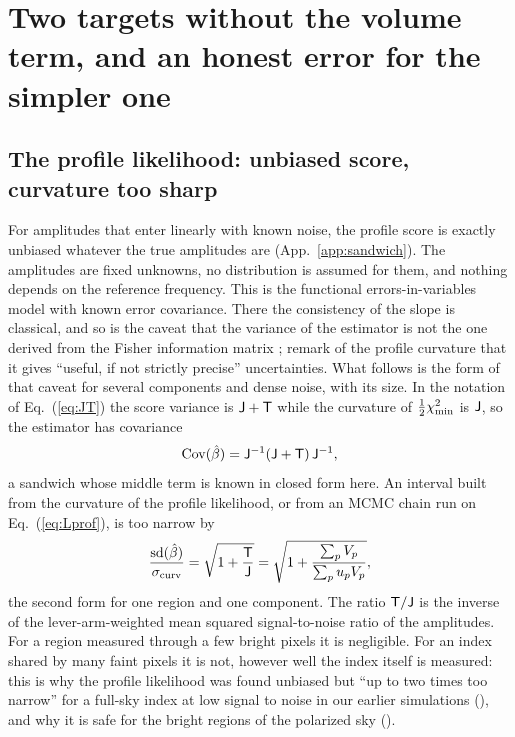 \section{Two targets without the volume term, and an honest error for the simpler one}
\label{sec:profile}

\subsection{The profile likelihood: unbiased score, curvature too sharp}

For amplitudes that enter linearly with known noise, the profile score is exactly unbiased
whatever the true amplitudes are (App.~\ref{app:sandwich}). The amplitudes are fixed unknowns, no
distribution is assumed for them, and nothing depends on the reference frequency. This is the
functional errors-in-variables model with known error covariance. There the consistency of the slope
is classical, and so is the caveat that the variance of the estimator is not the one derived from
the Fisher information matrix \citep[][and references therein; \citealt{fuller1987} is the textbook]{engel1985};
\citet{stompor2009} remark
of the profile curvature that it gives ``useful, if not strictly precise'' uncertainties. What
follows is the form of that caveat for several components and dense noise, with its size. In the notation of Eq.~(\ref{eq:JT}) the score variance is $\mathsf{J} + \mathsf{T}$ while the
curvature of $\tfrac12\chi^2_{\min}$ is $\mathsf{J}$, so the estimator has covariance
\begin{equation}
  \mathrm{Cov}(\hat\beta) = \mathsf{J}^{-1} (\mathsf{J} + \mathsf{T})\, \mathsf{J}^{-1} ,
  \label{eq:sandwich}
\end{equation}
a sandwich \citep{huber1967,white1982} whose middle term is known in closed form here. An interval
built from the curvature of the profile likelihood, or from an MCMC chain run on
Eq.~(\ref{eq:Lprof}), is too narrow by
\begin{equation}
  \frac{\mathrm{sd}(\hat\beta)}{\sigma_{\rm curv}} = \sqrt{1 + \frac{\mathsf{T}}{\mathsf{J}}}
  = \sqrt{1 + \frac{\sum_p V_p}{\sum_p u_p V_p}} ,
  \label{eq:sdz}
\end{equation}
the second form for one region and one component. The ratio $\mathsf{T}/\mathsf{J}$ is the inverse of the
lever-arm-weighted mean squared signal-to-noise ratio of the amplitudes. For a region measured through
a few bright pixels it is negligible. For an index shared by many faint pixels it is not, however
well the index itself is measured: this is why the profile likelihood was found unbiased but ``up to
two times too narrow'' for a full-sky index at low signal to noise in our earlier simulations
(), and why it is safe for the bright regions of the polarized sky ().

